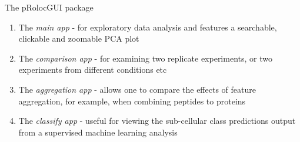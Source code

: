 \documentclass[bigger]{beamer}
\begin{document}

\begin{frame}{The pRolocGUI package}
 \begin{small}
\begin{enumerate}
\item The \textit{main app} - for exploratory data analysis and features a
searchable, clickable and zoomable PCA plot
\item The \textit{comparison app} - for examining two replicate experiments,
or two experiments from different conditions etc
\item The \textit{aggregation app} - allows one to compare the effects of
feature aggregation, for example, when combining peptides to proteins
\item The \textit{classify app} - useful for viewing the sub-cellular class
predictions output from a supervised machine learning analysis
\end{enumerate}
\end{small}
\end{frame}






\end{document}
